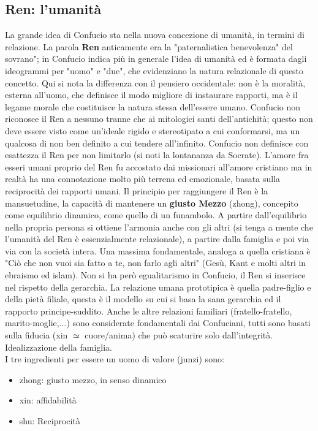 \documentclass[10pt,a4paper]{report}
\begin{document}
\subsection{Ren: l'umanità}
La grande idea di Confucio sta nella nuova concezione di umanità, in termini di relazione. La parola \textbf{Ren} anticamente era la "paternalistica benevolenza" del sovrano"; in Confucio indica più in generale l'idea di umanità ed è formata dagli ideogrammi per "uomo" e "due", che evidenziano la natura relazionale di questo concetto. Qui si nota la differenza con il pensiero occidentale: non è la moralità, esterna all'uomo, che definisce il modo migliore di instaurare rapporti, ma è il legame morale che costituisce la natura stessa dell'essere umano. Confucio non riconosce il Ren a nessuno tranne che ai mitologici santi dell'antichità; questo non deve essere visto come un'ideale rigido e stereotipato a cui conformarsi, ma un qualcosa di non ben definito a cui tendere all'infinito. Confucio non definisce con esattezza il Ren per non limitarlo (si noti la lontananza da Socrate). L'amore fra esseri umani proprio del Ren fu accostato dai missionari all'amore cristiano ma in realtà ha una connotazione molto più terrena ed emozionale, basata sulla reciprocità dei rapporti umani. Il principio per raggiungere il Ren è la mansuetudine, la capacità di mantenere un \textbf{giusto Mezzo} (zhong), concepito come equilibrio dinamico, come quello di un funambolo. A partire dall'equilibrio nella propria persona si ottiene l'armonia anche con gli altri (si tenga a mente che l'umanità del Ren è essenzialmente relazionale), a partire dalla famiglia e poi via via con la società intera. Una massima fondamentale, analoga a quella cristiana è "Ciò che non vuoi sia fatto a te, non farlo agli altri" (Gesù, Kant e molti altri in ebraismo ed islam). Non si ha però egualitarismo in Confucio, il Ren si inserisce nel rispetto della gerarchia. La relazione umana prototipica è quella padre-figlio e della pietà filiale, questa è il modello su cui si basa la sana gerarchia ed il rapporto principe-suddito. Anche le altre relazioni familiari (fratello-fratello, marito-moglie,...) sono considerate fondamentali dai Confuciani, tutti sono basati sulla fiducia (xin $\simeq$ cuore/anima) che può scaturire solo dall'integrità. Idealizzazione della famiglia.\\
I tre ingredienti per essere un uomo di valore (junzi) sono:
\begin{itemize}
	\item zhong: giusto mezzo, in senso dinamico
	\item xin: affidabilità
	\item shu: Reciprocità 
\end{itemize}
\end{document}
